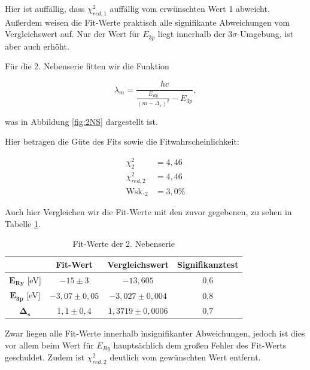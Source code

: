 \documentclass{article}
\begin{document}
\phantom{.}

Hier ist auffällig, dass $\chi^2_{red,1}$ auffällig vom erwünschten Wert 1 abweicht. Außerdem weisen die Fit-Werte praktisch alle signifikante Abweichungen vom Vergleichswert auf. Nur der Wert für $E_{3p}$ liegt innerhalb der $3\sigma$-Umgebung, ist aber auch erhöht.
\newpage

Für die 2. Nebenserie fitten wir die Funktion

\begin{equation}
    \lambda_m = \frac{hc}{\frac{E_{Ry}}{(m - \Delta_s)^2} - E_{3p}},
\end{equation}

was in Abbildung \ref{fig:2NS} dargestellt ist.

Hier betragen die Güte des Fits sowie die Fitwahrscheinlichkeit:

\begin{equation}
    \begin{split}
        \chi^2_2 &= 4,46 \\
        \chi^2_{red,2} &= 4,46 \\
        \text{Wsk.}_2 &= 3,0 \%
    \end{split}
\end{equation}

Auch hier Vergleichen wir die Fit-Werte mit den zuvor gegebenen, zu sehen in Tabelle \ref{tab:Fit2}.

\phantom{.}

\begin{table}[!h]
    \centering
    \begin{tabular}{c|ccc}
        \hline
        \textbf{} & \textbf{Fit-Wert} & \textbf{Vergleichswert} & \textbf{Signifikanztest} \\ \hline
        $\mathbf{E_{Ry}}$ [eV] &     $-15 \pm 3$      &     $ -13,605 $      &     0,6      \\
        $\mathbf{E_{3p}}$ [eV] &     $-3,07 \pm 0,05$      &      $ -3,027 \pm 0,004 $     &    0,8       \\
        $\mathbf{\Delta_s}$ &      $1,1 \pm 0,4$     &     $ 1,3719 \pm 0,0006 $      &      0,7     \\ \hline
    \end{tabular}
    \caption{Fit-Werte der 2. Nebenserie}
    \label{tab:Fit2}
\end{table}

\phantom{.}

Zwar liegen alle Fit-Werte innerhalb insignifikanter Abweichungen, jedoch ist dies vor allem beim Wert für $E_{Ry}$ hauptsächlich dem großen Fehler des Fit-Werts geschuldet. Zudem ist $\chi^2_{red,2}$ deutlich vom gewünschten Wert entfernt.
\end{document}
